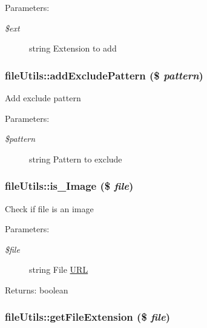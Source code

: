 \begin{Desc}
\item[Parameters:]
\begin{description}
\item[{\em \$ext}]string Extension to add \end{description}
\end{Desc}
\hypertarget{classfileUtils_5931bcfd408acd6df733b2b4fc86c42f}{
\subsubsection[addExcludePattern]{\setlength{\rightskip}{0pt plus 5cm}fileUtils::addExcludePattern (\$ {\em pattern})}}
\label{classfileUtils_5931bcfd408acd6df733b2b4fc86c42f}


Add exclude pattern

\begin{Desc}
\item[Parameters:]
\begin{description}
\item[{\em \$pattern}]string Pattern to exclude \end{description}
\end{Desc}
\hypertarget{classfileUtils_ba630d67291c6b07203727475fb71892}{
\subsubsection[is\_\-Image]{\setlength{\rightskip}{0pt plus 5cm}fileUtils::is\_\-Image (\$ {\em file})}}
\label{classfileUtils_ba630d67291c6b07203727475fb71892}


Check if file is an image

\begin{Desc}
\item[Parameters:]
\begin{description}
\item[{\em \$file}]string File \hyperlink{classURL}{URL} \end{description}
\end{Desc}
\begin{Desc}
\item[Returns:]boolean \end{Desc}
\hypertarget{classfileUtils_1918c6f410a2efcb3785e48454f15eaf}{
\subsubsection[getFileExtension]{\setlength{\rightskip}{0pt plus 5cm}fileUtils::getFileExtension (\$ {\em file})}}
\label{classfileUtils_1918c6f410a2efcb3785e48454f15eaf}


